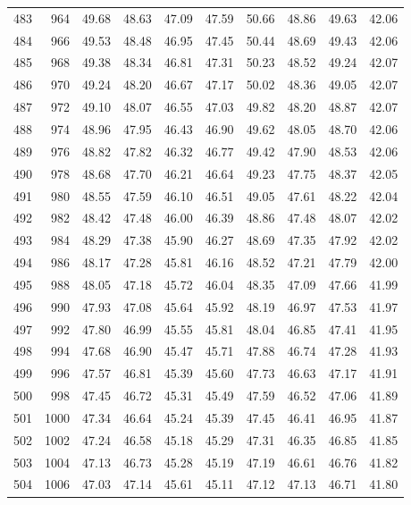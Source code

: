 \begin{longtable}{rrllllllll}
		483 & 964 & 49.68 & 48.63 & 47.09 & 47.59 & 50.66 & 48.86 & 49.63 & 42.06 \\ 
		484 & 966 & 49.53 & 48.48 & 46.95 & 47.45 & 50.44 & 48.69 & 49.43 & 42.06 \\ 
		485 & 968 & 49.38 & 48.34 & 46.81 & 47.31 & 50.23 & 48.52 & 49.24 & 42.07 \\ 
		486 & 970 & 49.24 & 48.20 & 46.67 & 47.17 & 50.02 & 48.36 & 49.05 & 42.07 \\ 
		487 & 972 & 49.10 & 48.07 & 46.55 & 47.03 & 49.82 & 48.20 & 48.87 & 42.07 \\ 
		488 & 974 & 48.96 & 47.95 & 46.43 & 46.90 & 49.62 & 48.05 & 48.70 & 42.06 \\ 
		489 & 976 & 48.82 & 47.82 & 46.32 & 46.77 & 49.42 & 47.90 & 48.53 & 42.06 \\ 
		490 & 978 & 48.68 & 47.70 & 46.21 & 46.64 & 49.23 & 47.75 & 48.37 & 42.05 \\ 
		491 & 980 & 48.55 & 47.59 & 46.10 & 46.51 & 49.05 & 47.61 & 48.22 & 42.04 \\ 
		492 & 982 & 48.42 & 47.48 & 46.00 & 46.39 & 48.86 & 47.48 & 48.07 & 42.02 \\ 
		493 & 984 & 48.29 & 47.38 & 45.90 & 46.27 & 48.69 & 47.35 & 47.92 & 42.02 \\ 
		494 & 986 & 48.17 & 47.28 & 45.81 & 46.16 & 48.52 & 47.21 & 47.79 & 42.00 \\ 
		495 & 988 & 48.05 & 47.18 & 45.72 & 46.04 & 48.35 & 47.09 & 47.66 & 41.99 \\ 
		496 & 990 & 47.93 & 47.08 & 45.64 & 45.92 & 48.19 & 46.97 & 47.53 & 41.97 \\ 
		497 & 992 & 47.80 & 46.99 & 45.55 & 45.81 & 48.04 & 46.85 & 47.41 & 41.95 \\ 
		498 & 994 & 47.68 & 46.90 & 45.47 & 45.71 & 47.88 & 46.74 & 47.28 & 41.93 \\ 
		499 & 996 & 47.57 & 46.81 & 45.39 & 45.60 & 47.73 & 46.63 & 47.17 & 41.91 \\ 
		500 & 998 & 47.45 & 46.72 & 45.31 & 45.49 & 47.59 & 46.52 & 47.06 & 41.89 \\ 
		501 & 1000 & 47.34 & 46.64 & 45.24 & 45.39 & 47.45 & 46.41 & 46.95 & 41.87 \\ 
		502 & 1002 & 47.24 & 46.58 & 45.18 & 45.29 & 47.31 & 46.35 & 46.85 & 41.85 \\ 
		503 & 1004 & 47.13 & 46.73 & 45.28 & 45.19 & 47.19 & 46.61 & 46.76 & 41.82 \\ 
		504 & 1006 & 47.03 & 47.14 & 45.61 & 45.11 & 47.12 & 47.13 & 46.71 & 41.80 \\ 

\end{longtable}
